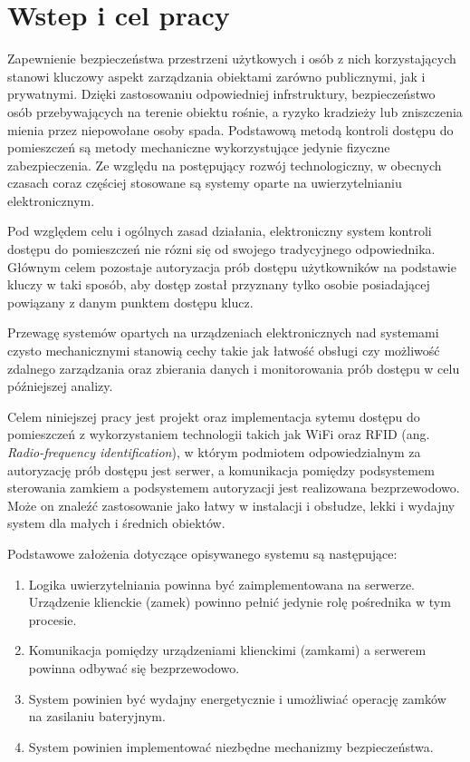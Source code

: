 \chapter{Wstep i cel pracy}

	Zapewnienie bezpieczeństwa przestrzeni użytkowych i osób z nich korzystających stanowi kluczowy aspekt zarządzania obiektami zarówno publicznymi, jak i prywatnymi. Dzięki zastosowaniu odpowiedniej infrstruktury, bezpieczeństwo osób przebywających na terenie obiektu rośnie, a ryzyko kradzieży lub zniszczenia mienia przez niepowołane osoby spada. Podstawową metodą kontroli dostępu do pomieszczeń są metody mechaniczne wykorzystujące jedynie fizyczne zabezpieczenia. Ze względu na postępujący rozwój technologiczny, w obecnych czasach coraz częściej stosowane są systemy oparte na uwierzytelnianiu elektronicznym.

	Pod względem celu i ogólnych zasad działania, elektroniczny system kontroli dostępu do pomieszczeń nie rózni się od swojego tradycyjnego odpowiednika. Głównym celem pozostaje autoryzacja prób dostępu użytkowników na podstawie kluczy w taki sposób, aby dostęp został przyznany tylko osobie posiadającej powiązany z danym punktem dostępu klucz.

	Przewagę systemów opartych na urządzeniach elektronicznych nad systemami czysto mechanicznymi stanowią cechy takie jak łatwość obsługi czy możliwość zdalnego zarządzania oraz zbierania danych i monitorowania prób dostępu w celu późniejszej analizy.

	Celem niniejszej pracy jest projekt oraz implementacja sytemu dostępu do pomieszczeń z wykorzystaniem technologii takich jak WiFi oraz RFID (ang. \textit{Radio-frequency identification}), w którym podmiotem odpowiedzialnym za autoryzację prób dostępu jest serwer, a komunikacja pomiędzy podsystemem sterowania zamkiem a podsystemem autoryzacji jest realizowana bezprzewodowo. Może on znaleźć zastosowanie jako łatwy w instalacji i obsłudze, lekki i wydajny system dla małych i średnich obiektów.

	Podstawowe założenia dotyczące opisywanego systemu są następujące:

	\begin{enumerate}
	    \item Logika uwierzytelniania powinna być zaimplementowana na serwerze. Urządzenie klienckie (zamek) powinno pełnić jedynie rolę pośrednika w tym procesie.
	    \item Komunikacja pomiędzy urządzeniami klienckimi (zamkami) a serwerem powinna odbywać się bezprzewodowo.
	    \item System powinien być wydajny energetycznie i umożliwiać operację zamków na zasilaniu bateryjnym.
	    \item System powinien implementować niezbędne mechanizmy bezpieczeństwa.
	\end{enumerate}

